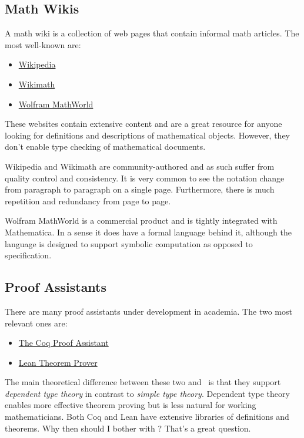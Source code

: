 \documentclass{amsart}
\begin{document}
\subsection{Math Wikis}

A math wiki is a collection of web pages that contain informal math articles.
The most well-known are:
\begin{itemize}
\item \href{https://en.wikipedia.org/wiki/Main_Page}{Wikipedia}
\item \href{https://meta.wikimedia.org/wiki/Wikimath}{Wikimath}
\item \href{https://mathworld.wolfram.com}{Wolfram MathWorld}
\end{itemize}

These websites contain extensive content and are a great resource for anyone looking for definitions and descriptions of
mathematical objects.
However, they don't enable type checking of mathematical documents.

Wikipedia and Wikimath are community-authored and as such suffer from quality control and consistency.
It is very common to see the notation change from paragraph to paragraph on a single page.
Furthermore, there is much repetition and redundancy from page to page.

Wolfram MathWorld is a commercial product and is tightly integrated with Mathematica.
In a sense it does have a formal language behind it, although the language is designed to support symbolic computation
as opposed to specification.

\subsection{Proof Assistants}

There are many proof assistants under development in academia.
The two most relevant ones are:
\begin{itemize}
\item \href{https://coq.inria.fr}{The Coq Proof Assistant}
\item \href{https://leanprover.github.io}{Lean Theorem Prover}
\end{itemize}

The main theoretical difference between these two and \ZN\ is that they support \emph{dependent type theory}
in contrast to \emph{simple type theory}.
Dependent type theory enables more effective theorem proving but is less natural for working mathematicians.
Both Coq and Lean have extensive libraries of definitions and theorems.
Why then should I bother with \ZN?
That's a great question.
\end{document}
